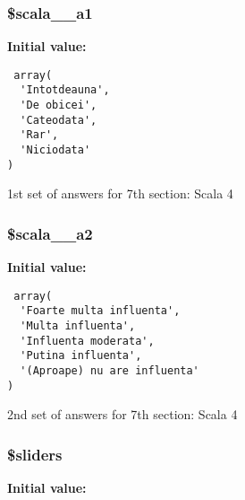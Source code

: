 \subsubsection{\setlength{\rightskip}{0pt plus 5cm}\$scala\_\_\-a1}\label{d1/d7c/a00003_7110dc6a3f39502ae87819281b7c10c8}


\textbf{Initial value:}

\begin{Code}\begin{verbatim} array(
  'Intotdeauna', 
  'De obicei', 
  'Cateodata', 
  'Rar', 
  'Niciodata'
)
\end{verbatim}\end{Code}
1st set of answers for 7th section: Scala 4 

\subsubsection{\setlength{\rightskip}{0pt plus 5cm}\$scala\_\_\-a2}\label{d1/d7c/a00003_c2675515d6d7756748e91de81940e39e}


\textbf{Initial value:}

\begin{Code}\begin{verbatim} array(
  'Foarte multa influenta', 
  'Multa influenta', 
  'Influenta moderata', 
  'Putina influenta', 
  '(Aproape) nu are influenta'
)
\end{verbatim}\end{Code}
2nd set of answers for 7th section: Scala 4 

\subsubsection{\setlength{\rightskip}{0pt plus 5cm}\$sliders}\label{d1/d7c/a00003_97ccdd6082fec9989cb0645740004d58}


\textbf{Initial value:}

